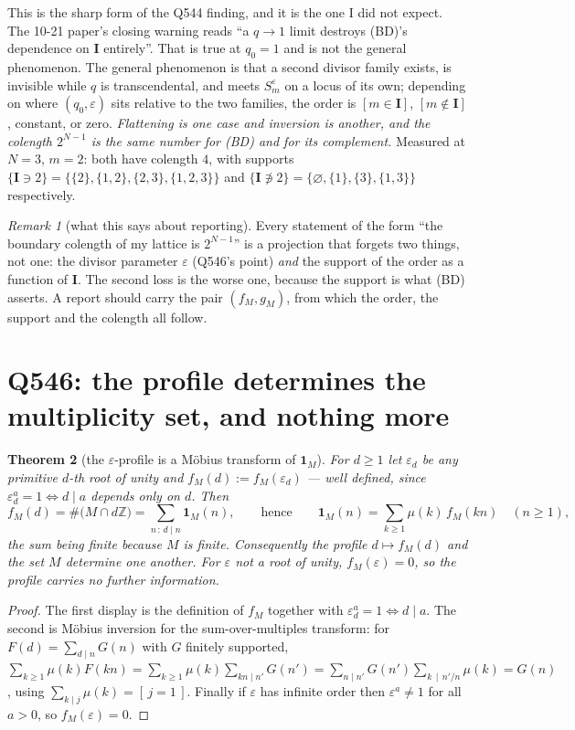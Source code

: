 \documentclass[11pt]{article}
\newtheorem{thm}{Theorem}
\theoremstyle{definition}
\theoremstyle{remark}
\newtheorem{rem}[thm]{Remark}
\newcommand{\bI}{\mathbf{I}}
\begin{document}
This is the sharp form of the Q544 finding, and it is the one I did not expect.  The 10-21
paper's closing warning reads ``a $q\to1$ limit destroys (BD)'s dependence on $\bI$
entirely''.  That is true at $q_0=1$ and is not the general phenomenon.  The general
phenomenon is that a second divisor family exists, is invisible while $q$ is
transcendental, and meets $S^{\varepsilon}_m$ on a locus of its own; depending on where
$(q_0,\varepsilon)$ sits relative to the two families, the order is $[m\in\bI]$,
$[m\notin\bI]$, constant, or zero.  \emph{Flattening is one case and inversion is another,
and the colength $2^{N-1}$ is the same number for (BD) and for its complement.}  Measured
at $N=3$, $m=2$: both have colength $4$, with supports
$\{\bI\ni2\}=\{\{2\},\{1,2\},\{2,3\},\{1,2,3\}\}$ and
$\{\bI\not\ni2\}=\{\varnothing,\{1\},\{3\},\{1,3\}\}$ respectively.

\begin{rem}[what this says about reporting]
Every statement of the form ``the boundary colength of my lattice is $2^{N-1}$'' is a
projection that forgets two things, not one: the divisor parameter $\varepsilon$
(Q546's point) \emph{and} the support of the order as a function of $\bI$.  The second
loss is the worse one, because the support is what (BD) asserts.  A report should carry
the pair $(f_M,g_M)$, from which the order, the support and the colength all follow.
\end{rem}

\section{Q546: the profile determines the multiplicity set, and nothing more}

\begin{thm}[the $\varepsilon$-profile is a Möbius transform of $\mathbf 1_M$]
\label{thm:profile}
For $d\ge1$ let $\varepsilon_d$ be any primitive $d$-th root of unity and
$f_M(d):=f_M(\varepsilon_d)$ --- well defined, since $\varepsilon_d^{a}=1\iff d\mid a$
depends only on $d$.  Then
\[
  f_M(d)=\#\bigl(M\cap d\mathbb{Z}\bigr)=\sum_{n\,:\,d\mid n}\mathbf 1_M(n),
  \qquad\text{hence}\qquad
  \mathbf 1_M(n)=\sum_{k\ge1}\mu(k)\,f_M(kn)\quad(n\ge1),
\]
the sum being finite because $M$ is finite.  Consequently the profile
$d\mapsto f_M(d)$ and the set $M$ determine one another.  For $\varepsilon$ not a root of
unity, $f_M(\varepsilon)=0$, so the profile carries no further information.
\end{thm}
\begin{proof}
The first display is the definition of $f_M$ together with $\varepsilon_d^{a}=1\iff d\mid a$.
The second is Möbius inversion for the sum-over-multiples transform: for $F(d)=\sum_{d\mid n}G(n)$
with $G$ finitely supported, $\sum_{k\ge1}\mu(k)F(kn)=\sum_{k\ge1}\mu(k)\sum_{kn\mid n'}G(n')
=\sum_{n\mid n'}G(n')\sum_{k\,\mid\,n'/n}\mu(k)=G(n)$, using
$\sum_{k\mid j}\mu(k)=[\,j=1\,]$.  Finally if $\varepsilon$ has infinite order then
$\varepsilon^{a}\ne1$ for all $a>0$, so $f_M(\varepsilon)=0$.
\end{proof}
\end{document}
